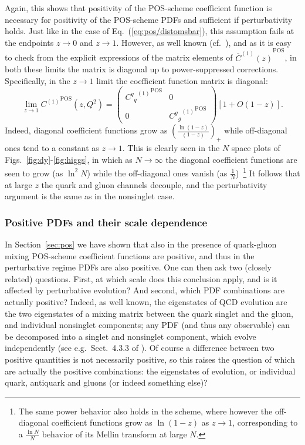Again, this shows that positivity of the POS-scheme  coefficient function is
necessary for positivity of the POS-scheme PDFs and sufficient if
perturbativity holds. Just like in the case of
Eq.~(\ref{eq:pos/distomsbar}), this assumption fails at the endpoints
$z\to0$ and $z\to 1$.
However, as well known (cf.\ \cite{Ellis:1991qj}), and as it is easy to check
from the explicit expressions of the matrix elements of ${\bar
C^{(1)}(z)}^{\textrm{POS}}$, in both these limits the matrix is diagonal up to
power-suppressed corrections.
Specifically, in the $z\to1$ limit the coefficient function matrix is
diagonal:
\begin{equation}\label{eq:pos/diag}
    \lim_{z\to 1}  {C^{(1)}}^{\textrm{POS}}(z,Q^2)=\left(\begin{array}{cc} {{{C^{q}}_q}^{(1)}}^{\textrm{POS}} &
      0 \\0 & {{{C^{g}}_g}^{(1)}}^{\textrm{POS}} \end{array}\right)\left[1+O(1-z)\right].
\end{equation}
Indeed, diagonal coefficient functions grow as
$\left(\frac{\ln(1-z)}{(1-z)}\right)_+$ while off-diagonal ones tend to a constant
as $z\to1$. This is clearly seen in the $N$ space plots of
Figs.~\ref{fig:dy}-\ref{fig:higgs}, in which as $N\to\infty$ the diagonal coefficient
functions are seen to grow (as $\ln^2N$) while the off-diagonal ones
vanish (as $\frac{1}{N}$)~\footnote{The same power behavior also
  holds in the \msbar{} scheme, where however the off-diagonal
  coefficient functions grow as $\ln(1-z)$ as $z\to 1$, corresponding
  to a $\frac{\ln N}{N}$ behavior of its Mellin transform at large $N$.}
It follows that at large $z$ the quark and gluon channels decouple, and
the perturbativity argument is the same as in the
nonsinglet case. 

\subsubsection{Positive PDFs and their scale dependence}
\label{sec:ap}


In Section~\ref{sec:pos}
we have shown that also in the presence of quark-gluon
mixing  POS-scheme
coefficient functions are positive, and thus in the perturbative
regime PDFs are also positive. One can then ask two (closely related)
questions. First, at which scale does this conclusion apply, and is it
affected by perturbative evolution? And second, which PDF combinations
are actually positive?
Indeed, as well known, the eigenstates of QCD evolution are the two
eigenstates of a mixing matrix between the quark singlet and the
gluon,  and individual nonsinglet components; any PDF (and thus any
observable) can be decomposed into a singlet and nonsinglet component,
which evolve independently (see
e.g.\ Sect.~4.3.3 of \cite{Ellis:1991qj}). Of course a difference
between two positive quantities is not necessarily positive, so this
raises the question of which are actually the positive combinations:
the eigenstates of evolution, or individual quark, antiquark and
gluons (or indeed something else)?

